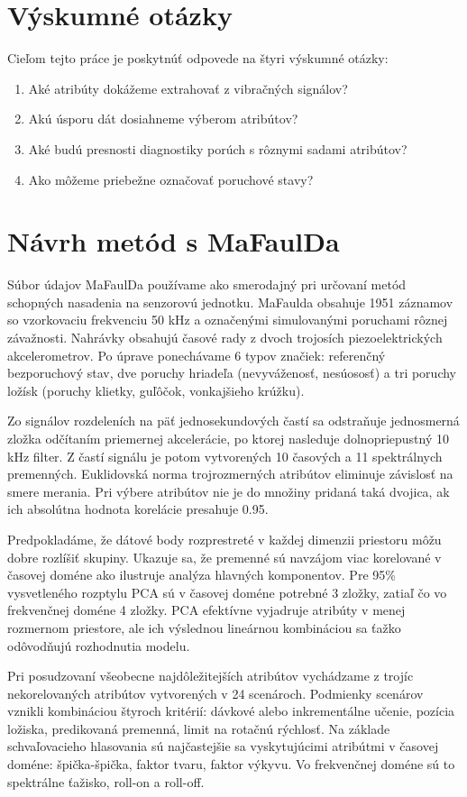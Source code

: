 \section{Výskumné otázky}
Cieľom tejto práce je poskytnúť odpovede na štyri výskumné otázky:
\begin{enumerate}
\itemsep0pt
\item Aké atribúty dokážeme extrahovať z vibračných signálov?
\item Akú úsporu dát dosiahneme výberom atribútov?
\item Aké budú presnosti diagnostiky porúch s rôznymi sadami atribútov?
\item Ako môžeme priebežne označovať poruchové stavy?
\end{enumerate}

\section{Návrh metód s MaFaulDa}
Súbor údajov MaFaulDa používame ako smerodajný pri určovaní metód schopných nasadenia na senzorovú jednotku. MaFaulda obsahuje 1951 záznamov so vzorkovaciu frekvenciu 50 kHz a označenými simulovanými poruchami rôznej závažnosti. Nahrávky obsahujú časové rady z dvoch trojosích piezoelektrických akcelerometrov. Po úprave ponechávame 6 typov značiek: referenčný bezporuchový stav, dve poruchy hriadeľa (nevyváženosť, nesúososť) a tri poruchy ložísk (poruchy klietky, guľôčok, vonkajšieho krúžku). 

Zo signálov rozdeleních na päť jednosekundových častí sa odstraňuje jednosmerná zložka odčítaním priemernej akcelerácie, po ktorej nasleduje dolnopriepustný 10 kHz filter. Z častí signálu je potom vytvorených 10 časových a 11 spektrálnych premenných. Euklidovská norma trojrozmerných atribútov eliminuje závislosť na smere merania. Pri výbere atribútov nie je do množiny pridaná taká dvojica, ak ich absolútna hodnota korelácie presahuje 0.95.

Predpokladáme, že dátové body rozprestreté v každej dimenzii priestoru môžu dobre rozlíšiť skupiny. Ukazuje sa, že premenné sú navzájom viac korelované v časovej doméne ako ilustruje analýza hlavných komponentov. Pre 95\% vysvetleného rozptylu PCA sú v časovej doméne potrebné 3 zložky, zatiaľ čo vo frekvenčnej doméne 4 zložky. PCA efektívne vyjadruje atribúty v menej rozmernom priestore, ale ich výslednou lineárnou kombináciou sa ťažko odôvodňujú rozhodnutia modelu.

Pri posudzovaní všeobecne najdôležitejších atribútov vychádzame z trojíc nekorelovaných atribútov vytvorených v 24 scenároch. Podmienky scenárov vznikli kombináciou štyroch kritérií: dávkové alebo inkrementálne učenie, pozícia ložiska, predikovaná premenná, limit na rotačnú rýchlosť. Na základe schvaľovacieho hlasovania sú najčastejšie sa vyskytujúcimi atribútmi v časovej doméne: špička-špička, faktor tvaru, faktor výkyvu. Vo frekvenčnej doméne sú to spektrálne ťažisko, roll-on a roll-off.

